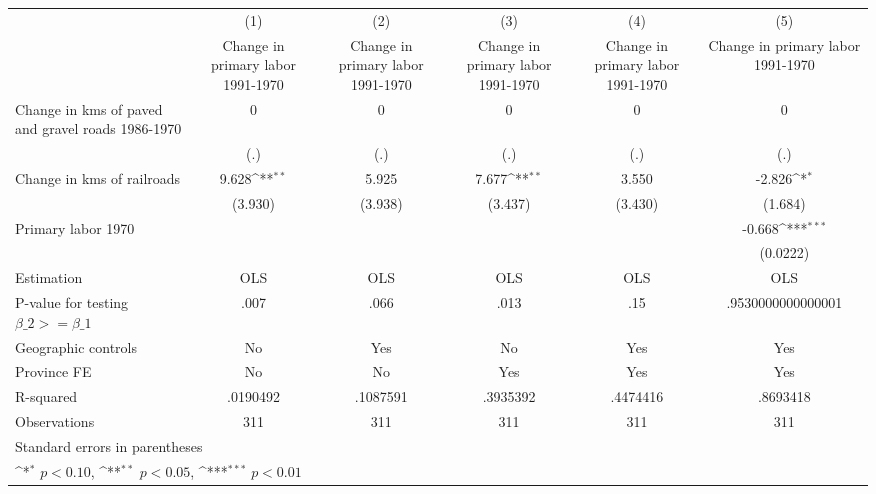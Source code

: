{
\def\sym#1{\ifmmode^{#1}\else\(^{#1}\)\fi}
\begin{tabular}{l*{5}{c}}
\hline\hline
                    &\multicolumn{1}{c}{(1)}&\multicolumn{1}{c}{(2)}&\multicolumn{1}{c}{(3)}&\multicolumn{1}{c}{(4)}&\multicolumn{1}{c}{(5)}\\
                    &\multicolumn{1}{c}{Change in primary labor 1991-1970}&\multicolumn{1}{c}{Change in primary labor 1991-1970}&\multicolumn{1}{c}{Change in primary labor 1991-1970}&\multicolumn{1}{c}{Change in primary labor 1991-1970}&\multicolumn{1}{c}{Change in primary labor 1991-1970}\\
\hline
Change in kms of paved and gravel roads 1986-1970&           0         &           0         &           0         &           0         &           0         \\
                    &         (.)         &         (.)         &         (.)         &         (.)         &         (.)         \\
[1em]
Change in kms of railroads&       9.628\sym{**} &       5.925         &       7.677\sym{**} &       3.550         &      -2.826\sym{*}  \\
                    &     (3.930)         &     (3.938)         &     (3.437)         &     (3.430)         &     (1.684)         \\
[1em]
Primary labor 1970  &                     &                     &                     &                     &      -0.668\sym{***}\\
                    &                     &                     &                     &                     &    (0.0222)         \\
\hline
Estimation          &         OLS         &         OLS         &         OLS         &         OLS         &         OLS         \\
P-value for testing $\beta\_2 >= \beta\_1$&        .007         &        .066         &        .013         &         .15         &.9530000000000001         \\
Geographic controls &          No         &         Yes         &          No         &         Yes         &         Yes         \\
Province FE         &          No         &          No         &         Yes         &         Yes         &         Yes         \\
R-squared           &    .0190492         &    .1087591         &    .3935392         &    .4474416         &    .8693418         \\
Observations        &         311         &         311         &         311         &         311         &         311         \\
\hline\hline
\multicolumn{6}{l}{\footnotesize Standard errors in parentheses}\\
\multicolumn{6}{l}{\footnotesize \sym{*} \(p<0.10\), \sym{**} \(p<0.05\), \sym{***} \(p<0.01\)}\\
\end{tabular}
}
